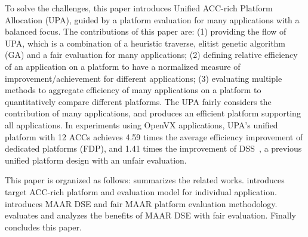 


To solve the challenges, this paper introduces Unified ACC-rich Platform Allocation (UPA), guided by a platform evaluation for many applications with a balanced focus. The contributions of this paper are: (1) providing the flow of UPA, which is a combination of a heuristic traverse, elitist genetic algorithm (GA) and a fair evaluation for many applications; (2) defining relative efficiency of an application on a platform to have a normalized measure of improvement/achievement for different applications; (3) evaluating multiple methods to aggregate efficiency of many applications on a platform to quantitatively compare different platforms. 
The UPA fairly considers the contribution of many applications, and produces an efficient platform supporting all applications. 
In experiments using OpenVX applications, UPA's unified platform with 12 ACCs achieves 4.59 times the average efficiency improvement of dedicated platforms (FDP), and 1.41 times the improvement of DSS~\cite{zhang2018ds}, a previous unified platform design with an unfair evaluation. 


This paper is organized as follows:  summarizes the related works.  introduces target ACC-rich platform and evaluation model for individual application.  introduces MAAR DSE and fair MAAR platform evaluation methodology.  evaluates and analyzes the benefits of MAAR DSE with fair evaluation. Finally  concludes this paper.



